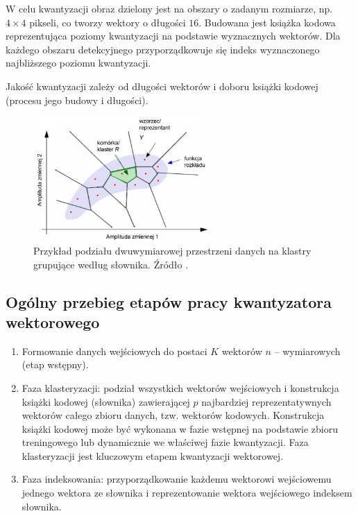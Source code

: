 \documentclass{article}
\begin{document}
W celu kwantyzacji obraz dzielony jest na obszary o zadanym rozmiarze, np. $4 \times 4$ pikseli, co tworzy wektory o długości $16$.
Budowana jest książka kodowa reprezentująca poziomy kwantyzacji na podstawie wyznacznych wektorów.
Dla każdego obszaru detekcyjnego przyporządkowuje się indeks wyznaczonego najbliższego poziomu kwantyzacji.

Jakość kwantyzacji zależy od długości wektorów i doboru książki kodowej (procesu jego budowy i długości).

\begin{figure}[H]
    \centering
    \includegraphics[width=0.6\textwidth]{images/kwantyzacja_wektorowa.png}
    \caption{Przykład podziału dwuwymiarowej przestrzeni danych na klastry grupujące według słownika. Źródło \cite{mwilczewski}.}
    \label{fig:kwantyzacja_wektorowa}
\end{figure}

\subsection{Ogólny przebieg etapów pracy kwantyzatora wektorowego}

\begin{enumerate}
  \item Formowanie danych wejściowych do postaci $K$ wektorów $n$ -- wymiarowych (etap wstępny). 
  \item Faza klasteryzacji: podział wszystkich wektorów wejściowych i konstrukcja książki 
    kodowej (słownika) zawierającej $p$ najbardziej reprezentatywnych wektorów całego zbioru danych, 
    tzw. wektorów kodowych. Konstrukcja książki kodowej może być wykonana w fazie wstępnej na podstawie zbioru 
    treningowego lub dynamicznie we właściwej fazie kwantyzacji. Faza klasteryzacji jest kluczowym etapem kwantyzacji wektorowej.
  \item Faza indeksowania: przyporządkowanie każdemu wektorowi wejściowemu jednego wektora ze słownika i reprezentowanie wektora wejściowego indeksem słownika. 
\end{enumerate}
\end{document}

